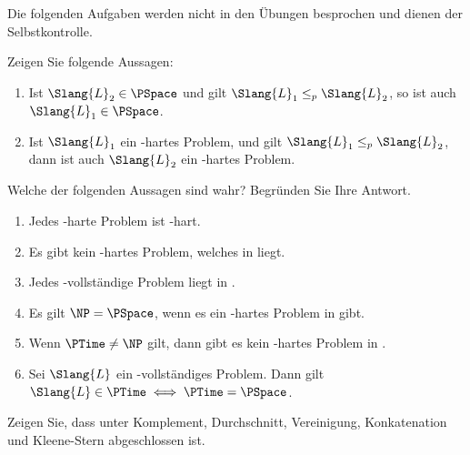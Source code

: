\documentclass[german]{latteachCD}[2017/03/28]
\begin{document}
\maketitle

\begin{mdframed}
  Die folgenden Aufgaben werden nicht in den Übungen besprochen und dienen der
  Selbstkontrolle.

  \renewcommand{\theexercise}{\BoldGreek{exercise}}
  \setcounter{exercise}{3}

  \begin{exercise}
    Zeigen Sie folgende Aussagen:
    \begin{enumerate}
    \item Ist $\Slang{L}_{2} \in \PSpace$ und gilt $\Slang{L}_{1} \leq_{p}
      \Slang{L}_{2}$, so ist auch $\Slang{L}_{1} \in \PSpace$.
    \item Ist $\Slang{L}_{1}$ ein \PSpace-hartes Problem, und gilt
      $\Slang{L}_{1} \leq_{p} \Slang{L}_{2}$, dann ist auch $\Slang{L}_{2}$ ein
      \PSpace-hartes Problem.
    \end{enumerate}
  \end{exercise}

  \begin{exercise}
    Welche der folgenden Aussagen sind wahr?  Begründen Sie Ihre Antwort.
    \begin{enumerate}
    \item Jedes \PSpace-harte Problem ist \NP-hart.
    \item Es gibt kein \NP-hartes Problem, welches in \PSpace{} liegt.
    \item Jedes \NP-vollständige Problem liegt in \PSpace.
    \item Es gilt $\NP = \PSpace$, wenn es ein \PSpace-hartes Problem in \NP{}
      gibt.
    \item Wenn $\PTime \neq \NP$ gilt, dann gibt es kein \NP-hartes Problem in
      \PTime.
    \item Sei $\Slang{L}$ ein \PSpace-vollständiges Problem.  Dann gilt
      $\Slang{L} \in \PTime \iff \PTime = \PSpace$.
    \end{enumerate}
  \end{exercise}
\end{mdframed}

\vspace*{0.5\baselineskip}

\setcounter{exercise}{0}

\begin{exercise}
  Zeigen Sie, dass \PSpace{} unter Komplement, Durchschnitt, Vereinigung,
  Konkatenation und Kleene-Stern abgeschlossen ist.
\end{exercise}
\end{document}
